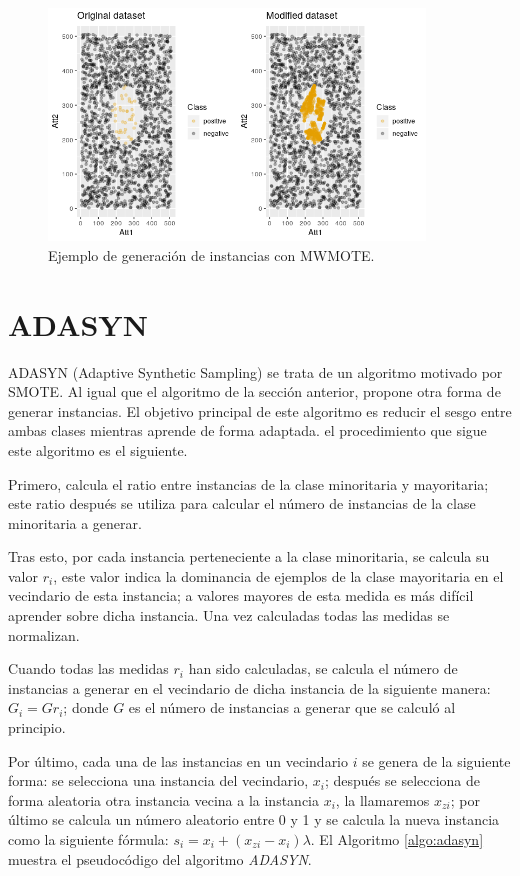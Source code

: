 \begin{figure}[H]
	\centering
	\includegraphics[width=100mm]{imagenes/MWMOTE_comparison.png}
	\caption{Ejemplo de generación de instancias con MWMOTE.}
	\label{fig:42}
\end{figure}
\verticalspace

\section{ADASYN}
ADASYN (Adaptive Synthetic Sampling) \cite{he2008adasyn} se trata de un algoritmo motivado por SMOTE. Al igual que el algoritmo de la sección anterior, propone otra forma de generar instancias. El objetivo principal de este algoritmo es reducir el sesgo entre ambas clases mientras aprende de forma adaptada. el procedimiento que sigue este algoritmo es el siguiente.\newline

Primero, calcula el ratio entre instancias de la clase minoritaria y mayoritaria; este ratio después se utiliza para calcular el número de instancias de la clase minoritaria a generar.\newline

Tras esto, por cada instancia perteneciente a la clase minoritaria, se calcula su valor $r_i$, este valor indica la dominancia de ejemplos de la clase mayoritaria en el vecindario de esta instancia; a valores mayores de esta medida es más difícil aprender sobre dicha instancia. Una vez calculadas todas las medidas se normalizan.\newline

Cuando todas las medidas $r_i$ han sido calculadas, se calcula el número de instancias a generar en el vecindario de dicha instancia de la siguiente manera: $G_i = G r_i$; donde $G$ es el número de instancias a generar que se calculó al principio.\newline
\newpage

Por último, cada una de las instancias en un vecindario $i$ se genera de la siguiente forma: se selecciona una instancia del vecindario, $x_i$; después se selecciona de forma aleatoria otra instancia vecina a la instancia $x_i$, la llamaremos $x_{zi}$; por último se calcula un número aleatorio entre 0 y 1 y se calcula la nueva instancia como la siguiente fórmula: $ s_i = x_i + (x_{zi}-x_i)\lambda$. El Algoritmo \ref{algo:adasyn} muestra el pseudocódigo del algoritmo \textit{ADASYN}.

